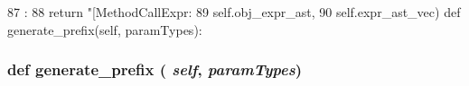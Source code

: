 \begin{DoxyCode}
87                       :
88         return "[MethodCallExpr: %
89                                               self.obj_expr_ast,
90                                               self.expr_ast_vec)
    def generate_prefix(self, paramTypes):
\end{DoxyCode}
\hypertarget{classslicc_1_1ast_1_1MethodCallExprAST_1_1MemberMethodCallExprAST_a706f9a281c5b0d05f80923a37adfa48e}{
\subsubsection[{generate\_\-prefix}]{\setlength{\rightskip}{0pt plus 5cm}def generate\_\-prefix ( {\em self}, \/   {\em paramTypes})}}
\label{classslicc_1_1ast_1_1MethodCallExprAST_1_1MemberMethodCallExprAST_a706f9a281c5b0d05f80923a37adfa48e}



